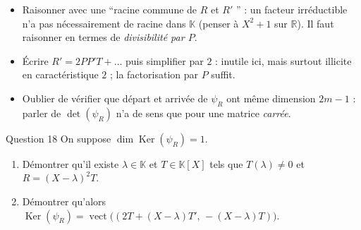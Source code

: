 \documentclass[11pt,a4paper]{article}
\newcommand{\og}{``}
\newcommand{\fg}{''}
\newcommand{\K}{\mathbb{K}}
\newcommand{\R}{\mathbb{R}}
\DeclareMathOperator{\Ker}{Ker}
\DeclareMathOperator{\vect}{vect}
\begin{document}
\begin{pieges}
\begin{itemize}[leftmargin=1.4em, itemsep=2pt]
\item Raisonner avec une \og racine commune de $R$ et $R'$ \fg{} : un
facteur irréductible n'a pas nécessairement de racine dans $\K$
(penser à $X^2+1$ sur $\R$). Il faut raisonner en termes de
\emph{divisibilité par $P$}.
\item Écrire $R'=2PP'T+\dots$ puis simplifier par $2$ : inutile ici,
mais surtout illicite en caractéristique $2$ ; la factorisation par
$P$ suffit.
\item Oublier de vérifier que départ et arrivée de $\psi_R$ ont même
dimension $2m-1$ : parler de $\det(\psi_R)$ n'a de sens que pour une
matrice \emph{carrée}.
\end{itemize}
\end{pieges}

\begin{enonce}{Question 18}
On suppose $\dim\Ker(\psi_R)=1$.
\begin{enumerate}
\item Démontrer qu'il existe $\lambda\in\K$ et $T\in\K[X]$ tels que
$T(\lambda)\neq 0$ et $R=(X-\lambda)^{2}T$.
\item Démontrer qu'alors
$\Ker(\psi_R)=\vect\big((2T+(X-\lambda)T',\,-(X-\lambda)T)\big)$.
\end{enumerate}
\end{enonce}
\end{document}
